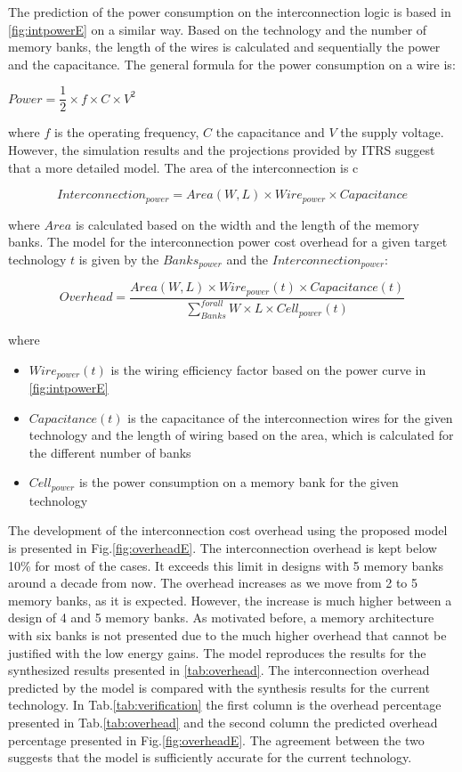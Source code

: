  The prediction of the power consumption on the interconnection logic is based in \ref{fig:intpowerE} on a similar way.
 Based on the technology and the number of memory banks, the length of the wires is calculated and sequentially the power and the capacitance.
 The general formula for the power consumption on a wire is:  
 \begin{center}
 $Power = \dfrac{1}{2} \times f \times C \times V^{2} $
 \end{center}
 where  $f$ is the operating frequency, $C$ the capacitance and $V$ the supply voltage.
 However, the simulation results and the projections provided by ITRS suggest that a more detailed model.
 The area of the interconnection is c
 \begin{center}
 $$ Interconnection_{power} = Area(W,L) \times Wire_{power} \times Capacitance $$
 \end{center}
 where $Area$ is calculated based on the width and the length of the memory banks.
 The model for the interconnection power cost overhead for a given target technology $ t $ is given by the $ Banks_{power}$ and the $ Interconnection_{power}$:
 \begin{center}
 $$ Overhead = \dfrac{Area(W,L) \times Wire_{power}(t) \times Capacitance(t)}{\sum_{Banks}^{for all} W \times L \times Cell_{power}(t)} $$ 
  \end{center}
 where 
 \begin{itemize}
 \item $ Wire_{power}(t) $ is the wiring efficiency factor based on the power curve in \ref{fig:intpowerE}
 \item $Capacitance(t)$ is the capacitance of the interconnection wires for the given technology and the length of wiring based on the area, which is calculated for the different number of banks
 \item $Cell_{power} $ is the power consumption on a memory bank for the given technology
 \end{itemize}
 
 The development of the interconnection cost overhead using the proposed model is presented in Fig.\ref{fig:overheadE}.
 The interconnection overhead is kept below 10\% for most of the cases.
 It exceeds this limit in designs with 5 memory banks around a decade from now.
 The overhead increases as we move from 2 to 5 memory banks, as it is expected.
 However, the increase is much higher between a design of 4 and 5 memory banks.
 As motivated before, a memory architecture with six banks is not presented due to the much higher overhead that cannot be justified with the low energy gains.
 The model reproduces the results for the synthesized results presented in \ref{tab:overhead}.
 The interconnection overhead predicted by the model is compared with the synthesis results for the current technology.
 In Tab.\ref{tab:verification} the first column is the overhead percentage presented in Tab.\ref{tab:overhead} and the second column the predicted overhead percentage presented in Fig.\ref{fig:overheadE}.
 The agreement between the two suggests that the model is sufficiently accurate for the current technology.
 
